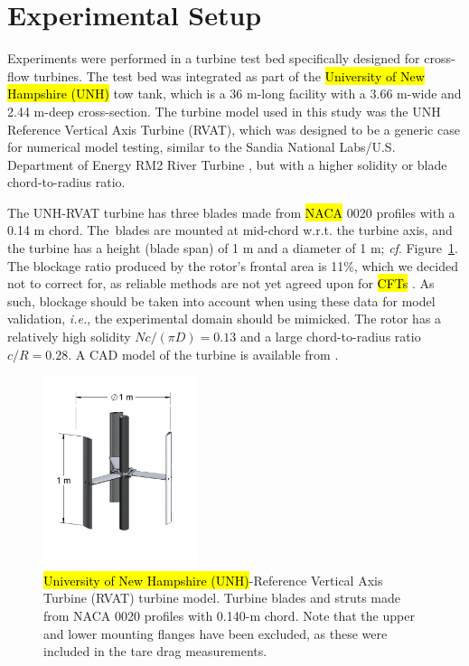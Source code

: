 \documentclass[energies,article,accept,moreauthors,pdftex,10pt,a4paper]{mdpi}
\theoremstyle{mdpi}
\newcounter{ex}
\newcounter{re}
\begin{document}
\section{Experimental Setup}

Experiments were performed in a turbine test bed specifically designed for
cross-flow turbines. The test bed was integrated as part of the \hl {University of New Hampshire (UNH)} 
 tow tank,
which is a 36 m-long facility with a 3.66 m-wide and 2.44 m-deep cross-section.
The turbine model used in this study was the UNH Reference Vertical Axis Turbine
(RVAT), which was designed to be a generic case for numerical model testing,
similar to the Sandia National Labs/U.S. Department of Energy RM2%
 River Turbine
\cite{Neary2014}, but with a higher solidity or blade chord-to-radius ratio.

The UNH-RVAT turbine has three blades made from \hl {NACA} 0020 profiles
  with a 0.14 m
chord. The~blades are mounted at mid-chord w.r.t. the turbine axis, and the
turbine has a height (blade span) of 1 m and a diameter of 1 m; \textit{cf}.
Figure~\ref{fig:turbine}. The blockage ratio produced by the rotor's frontal
area is 11\%, which we decided not to correct for, as reliable methods are
not yet agreed upon for \hl {CFTs} %
\cite{Cavagnaro2014}. As such, blockage should be
taken into account when using these data for model validation, \emph{i.e.}, the
experimental domain should be mimicked. The rotor has a relatively high solidity
$Nc/(\pi D) = 0.13$ and a large chord-to-radius ratio $c/R = 0.28$. A CAD model of
the turbine is available from \cite{Bachant2014-RVAT-CAD}.

\begin{figure}[H]
\centering

\includegraphics[width=0.4\textwidth]{figures/turbine}

\caption{\hl {University of New Hampshire (UNH)}-Reference Vertical Axis Turbine (RVAT) turbine model. Turbine blades and struts made from NACA 0020
 profiles with 0.140-m chord. Note that the upper and lower mounting flanges have
 been excluded, as these were included in the tare drag measurements.}

\label{fig:turbine}
\end{figure}
\end{document}
